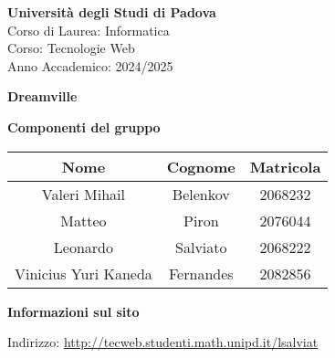 \begin{minipage}{0.3\textwidth}
    \centering
\end{minipage}
\hfill
\begin{minipage}{0.3\textwidth}
    \centering
\end{minipage}

\bigskip

\begin{center}
    \textbf{Università degli Studi di Padova} \\
    Corso di Laurea: Informatica \\
    Corso: Tecnologie Web \\
    Anno Accademico: 2024/2025
\end{center}

\bigskip
\bigskip
\bigskip

\begin{center}
  \Huge\textbf{Dreamville}
\end{center}

\begin{center}
    \textbf{Componenti del gruppo}
\end{center}
\begin{table}[H]
    \centering
    \begin{tabular}{|c|c|c|}
        \hline
        \cellcolor[HTML]{FFCC00} \textbf{Nome} & \cellcolor[HTML]{FFCC00} \textbf{Cognome} & \cellcolor[HTML]{FFCC00} \textbf{Matricola}  \\ 
        \hline
        Valeri Mihail & Belenkov & 2068232 \\ 
        \hline
        Matteo & Piron & 2076044\\ 
        \hline
        Leonardo & Salviato & 	2068222  \\ 
        \hline
        Vinicius Yuri Kaneda & Fernandes & 	2082856 \\ 
        \hline
    \end{tabular}
\end{table}

\begin{center}
    \textbf{Informazioni sul sito}   

    Indirizzo: \url{http://tecweb.studenti.math.unipd.it/lsalviat} 
\end{center}

